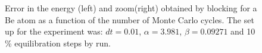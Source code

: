 \begin{figure}[!hbt]
\begin{center}
\begin{tabular}{cc}
			 \end{tabular}
      \caption{Error in the energy (left) and zoom(right) obtained by blocking for a Be atom as a function of the number of Monte Carlo cycles. The set up for the experiment was: $dt = 0.01$, $\alpha = 3.981$, $\beta = 0.09271$ and 10 \% equilibration steps by run.}
      \label{errorVsMcBe}
    \end{center}
  \end{figure}





\clearemptydoublepage

